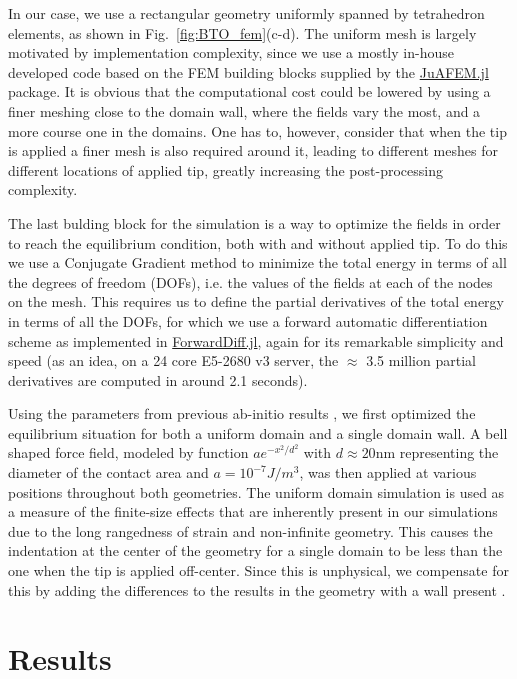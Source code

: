 In our case, we use a rectangular geometry uniformly spanned by tetrahedron elements, as shown in Fig.~\ref{fig:BTO_fem}(c-d).
The uniform mesh is largely motivated by implementation complexity, since we use a mostly in-house developed code based on the FEM building blocks supplied by the \href{https://github.com/KristofferC/JuAFEM.jl}{JuAFEM.jl} package.
It is obvious that the computational cost could be lowered by using a finer meshing close to the domain wall, where the fields vary the most, and a more course one in the domains.
One has to, however, consider that when the tip is applied a finer mesh is also required around it, leading to different meshes for different locations of applied tip, greatly increasing the post-processing complexity.

The last bulding block for the simulation is a way to optimize the fields in order to reach the equilibrium condition, both with and without applied tip.
To do this we use a Conjugate Gradient method to minimize the total energy in terms of all the degrees of freedom (DOFs), i.e. the values of the fields at each of the nodes on the mesh.
This requires us to define the partial derivatives of the total energy in terms of all the DOFs, for which we use a forward automatic differentiation scheme as implemented in \href{www.juliadiff.org/ForwardDiff.jl/latest/}{ForwardDiff.jl}, again for its remarkable simplicity and speed (as an idea, on a 24 core E5-2680 v3 server, the $\approx$ 3.5 million partial derivatives are computed in around 2.1 seconds).

Using the parameters from previous ab-initio results \cite{Marton2010}, we first optimized the equilibrium situation for both a uniform domain and a single domain wall.
A bell shaped force field, modeled by function $a e^{-x^2/d^2}$ with $d \approx 20$nm representing the diameter of the contact area and $a = 10^{-7} J/m^3$, was then applied at various positions throughout both geometries.
The uniform domain simulation is used as a measure of the finite-size effects that are inherently present in our simulations due to the long rangedness of strain and non-infinite geometry.
This causes the indentation at the center of the geometry for a single domain to be less than the one when the tip is applied off-center.
Since this is unphysical, we compensate for this by adding the differences to the results in the geometry with a wall present .

\section{Results}

